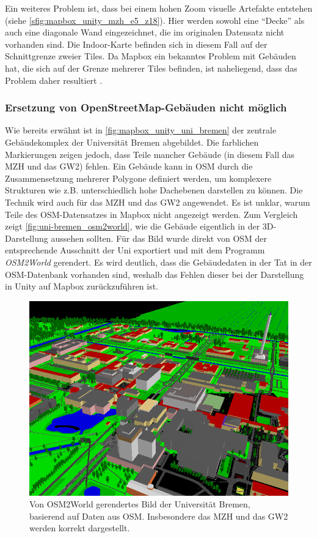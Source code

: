 Ein weiteres Problem ist, dass bei einem hohen Zoom visuelle Artefakte entstehen (siehe \autoref{sfig:mapbox_unity_mzh_e5_z18}).
Hier werden sowohl eine \enquote{Decke} als auch eine diagonale Wand eingezeichnet, die im originalen Datensatz nicht vorhanden sind.
Die Indoor-Karte befinden sich in diesem Fall auf der Schnittgrenze zweier Tiles.
Da Mapbox ein bekanntes Problem mit Gebäuden hat, die sich auf der Grenze mehrerer Tiles befinden, ist naheliegend, dass das Problem daher resultiert \autocite{Mapbox2018c}.

\subsubsection*{Ersetzung von OpenStreetMap-Gebäuden nicht möglich}
Wie bereits erwähnt ist in \autoref{fig:mapbox_unity_uni_bremen} der zentrale Gebäudekomplex der Universität Bremen abgebildet.
Die farblichen Markierungen zeigen jedoch, dass Teile mancher Gebäude (in diesem Fall das MZH und das GW2) fehlen.
Ein Gebäude kann in OSM durch die Zusammensetzung mehrerer Polygone definiert werden, um komplexere Strukturen wie z.B. unterschiedlich hohe Dachebenen darstellen zu können.
Die Technik wird auch für das MZH und das GW2 angewendet.
Es ist unklar, warum Teile des OSM-Datensatzes in Mapbox nicht angezeigt werden.
Zum Vergleich zeigt \autoref{fig:uni-bremen_osm2world}, wie die Gebäude eigentlich in der 3D-Darstellung aussehen sollten.
Für das Bild wurde direkt von OSM der entsprechende Ausschnitt der Uni exportiert und mit dem Programm \emph{OSM2World} gerendert.
Es wird deutlich, dass die Gebäudedaten in der Tat in der OSM-Datenbank vorhanden sind, weshalb das Fehlen dieser bei der Darstellung in Unity auf Mapbox zurückzuführen ist.

\begin{figure}
    \centering
    \includegraphics[width=\textwidth]{figures/uni-bremen_osm2world}
    \caption{Von OSM2World gerendertes Bild der Universität Bremen, basierend auf Daten aus OSM.\@ %
    Insbesondere das MZH und das GW2 werden korrekt dargestellt.%
    }
    \label{fig:uni-bremen_osm2world}
\end{figure}

